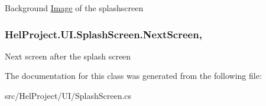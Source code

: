 Background \hyperlink{class_hel_project_1_1_u_i_1_1_image}{Image} of the splashscreen 

\hypertarget{class_hel_project_1_1_u_i_1_1_splash_screen_abcc41435703b36b419b18600a05a42f5}{}
\subsubsection[{Next\+Screen}]{ Hel\+Project.\+U\+I.\+Splash\+Screen.\+Next\+Screen\hspace{0.3cm}{\ttfamily [get]}, {\ttfamily [set]}}\label{class_hel_project_1_1_u_i_1_1_splash_screen_abcc41435703b36b419b18600a05a42f5}


Next screen after the splash screen 



The documentation for this class was generated from the following file\+:\begin{DoxyCompactItemize}
\item 
src/\+Hel\+Project/\+U\+I/Splash\+Screen.\+cs\end{DoxyCompactItemize}
